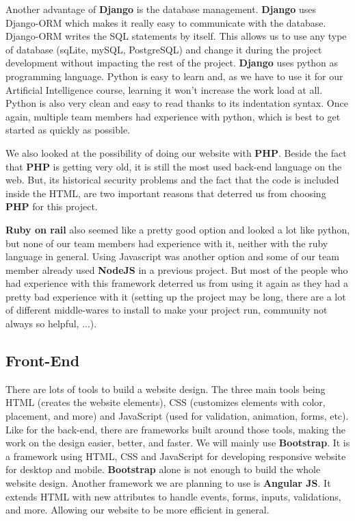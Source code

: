 Another advantage of \textbf{Django} is the database management. \textbf{Django} uses Django-ORM which makes it really easy to communicate with the database. Django-ORM writes the SQL statements by itself. This allows us to use any type of database (sqLite, mySQL, PostgreSQL) and change it during the project development without impacting the rest of the project.
\textbf{Django} uses python as programming language. Python is easy to learn and, as we have to use it for our Artificial Intelligence course, learning it won't increase the work load at all.
Python is also very clean and easy to read thanks to its indentation syntax. Once again, multiple team members had experience with python, which is best to get started as quickly as possible.\newline

We also looked at the possibility of doing our website with \textbf{PHP}. Beside the fact that \textbf{PHP} is getting very old, it is still the most used back-end language on the web. But, its historical security problems and the fact that the code is included inside the HTML, are two important reasons that deterred us from choosing \textbf{PHP} for this project.\newline

\textbf{Ruby on rail} also seemed like a pretty good option and looked a lot like python, but none of our team members had experience with it, neither with the ruby language in general. Using Javascript was another option and some of our team member already used \textbf{NodeJS} in a previous project. But most of the people who had experience with this framework deterred us from using it again as they had a pretty bad experience with it (setting up the project may be long, there are a lot of different middle-wares to install to make your project run, community not always so helpful, ...).

\subsection{Front-End}

There are lots of tools to build a website design. The three main tools being HTML (creates the website elements), CSS (customizes elements with color, placement, and more) and JavaScript (used for validation, animation, forms, etc). Like for the back-end, there are frameworks built around those tools, making the work on the design easier, better, and faster. We will mainly use \textbf{Bootstrap}. It is a framework using HTML, CSS and JavaScript for developing responsive website for desktop and mobile. \textbf{Bootstrap} alone is not enough to build the whole website design. Another framework we are planning to use is \textbf{Angular JS}. It extends HTML with new attributes to handle events, forms, inputs, validations, and more. Allowing our website to be more efficient in general. \newline

